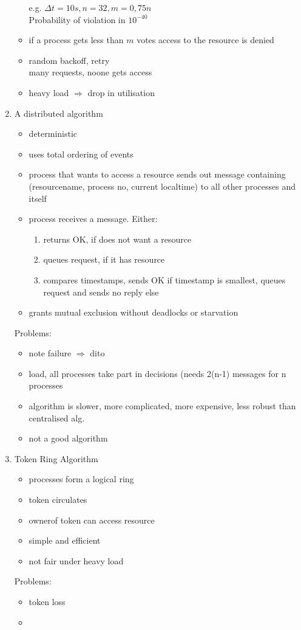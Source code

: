 \documentclass[ngerman,a4paper]{report}
\begin{document}
\begin{enumerate}
\begin{itemize}
				e.g. $\Delta t = 10s, n=32, m=0,75n$\\
				Probability of violation in $10^{-40}$
			\item if a process gets less than $m$ votes access to the resource is denied
			\item random backoff, retry\\
				many requests, noone gets access
			\item heavy load $\Rightarrow$ drop in utilisation
		\end{itemize}
	\item A distributed algorithm\\
		\begin{itemize}
			\item deterministic
			\item uses total ordering of events
			\item process that wants to access a resource sends out message containing (resourcename, process no, current localtime) to all other processes and itself
			\item process receives a message. Either:\\
				\begin{enumerate}
					\item returns OK, if does not want a resource
					\item queues request, if it has resource
					\item compares timestamps, sends OK if timestamp is smallest, queues request and sends no reply else
				\end{enumerate}
			\item grants mutual exclusion without deadlocks or starvation
		\end{itemize}
		Problems: \begin{itemize}
				
			\item note failure $\Rightarrow$ dito
			\item load, all processes take part in decisions (needs 2(n-1) messages for n processes
			\item algorithm is slower, more complicated, more expensive, less robust than centralised alg.
			\item not a good algorithm
		\end{itemize}
	\item Token Ring Algorithm\\
		\begin{itemize}
			\item processes form a logical ring
			\item token circulates
			\item ownerof token can access resource
			\item simple and efficient
			\item not fair under heavy load
		\end{itemize}
		Problems:\begin{itemize}
			\item token loss
			\item 
		\end{itemize}
	

\end{enumerate}
\end{document}
